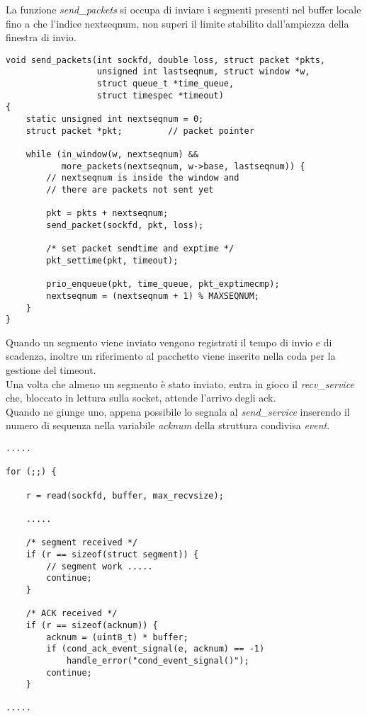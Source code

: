 La funzione \emph{send\_packets} si occupa di inviare i segmenti presenti nel
buffer locale fino a che l'indice nextseqnum, non superi il limite stabilito
dall'ampiezza della finestra di invio.
\begin{lstlisting}[title=transport.c]
void send_packets(int sockfd, double loss, struct packet *pkts,
                  unsigned int lastseqnum, struct window *w,
                  struct queue_t *time_queue, 
				  struct timespec *timeout)
{
    static unsigned int nextseqnum = 0;
    struct packet *pkt;         // packet pointer

    while (in_window(w, nextseqnum) &&
           more_packets(nextseqnum, w->base, lastseqnum)) {
        // nextseqnum is inside the window and
        // there are packets not sent yet

        pkt = pkts + nextseqnum;
        send_packet(sockfd, pkt, loss);

        /* set packet sendtime and exptime */
        pkt_settime(pkt, timeout);

        prio_enqueue(pkt, time_queue, pkt_exptimecmp);
        nextseqnum = (nextseqnum + 1) % MAXSEQNUM;
    }
}
\end{lstlisting}
Quando un segmento viene inviato vengono registrati il tempo di invio e di
scadenza, inoltre un riferimento al pacchetto viene inserito nella coda 
per la gestione del timeout.\\
Una volta che almeno un segmento è stato inviato, entra in gioco il 
\emph{recv\_service} che, bloccato in lettura sulla socket, attende l'arrivo
degli ack.\\
Quando ne giunge uno, appena possibile lo segnala al \emph{send\_service} 
inserendo il numero di sequenza nella variabile \emph{acknum} della
struttura condivisa \emph{event}.
\begin{lstlisting}[title=transport.c]
.....

for (;;) {

	r = read(sockfd, buffer, max_recvsize);

	.....

	/* segment received */
	if (r == sizeof(struct segment)) {
		// segment work .....
		continue;
	}

	/* ACK received */
	if (r == sizeof(acknum)) {
		acknum = (uint8_t) * buffer;
		if (cond_ack_event_signal(e, acknum) == -1)
			handle_error("cond_event_signal()");
		continue;
	}

.....
\end{lstlisting}

